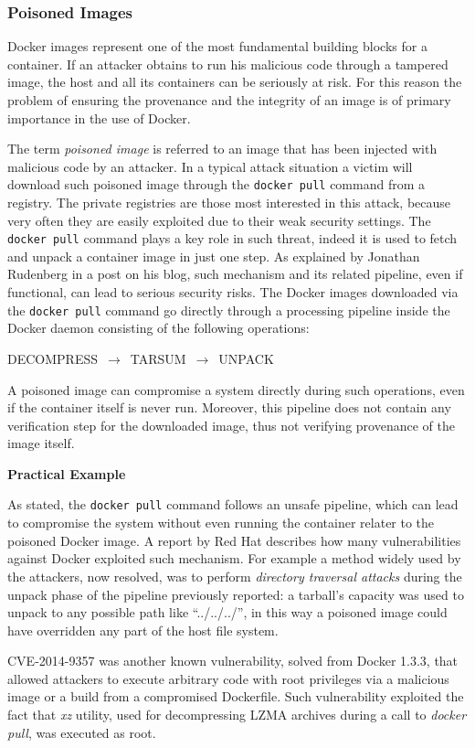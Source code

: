 \documentclass[a4paper,12pt]{article}
\newcommand{\code}[1]{\lstinline|#1|}
\begin{document}
\subsubsection{Poisoned Images}

Docker images represent one of the most fundamental building blocks for a
container. If an attacker obtains to run his malicious code through a tampered image, the host
and all its containers can be seriously at risk. For this reason the problem of
ensuring the provenance and the integrity of an image is of primary importance in the use of
Docker. \par The term \textit{poisoned image} is referred to an image that has
been injected with malicious code by an attacker. In a typical attack
situation a victim will download such poisoned image through the \code{docker
pull} command from a registry. The private registries are those most interested
in this attack, because very often they are easily exploited due to their weak
security settings. The \code{docker pull} command plays a key role in such
threat, indeed it is used to fetch and unpack a container image in just one
step. As explained by Jonathan Rudenberg in a post
\cite{docker_image_insecurity} on his blog, such mechanism and its related
pipeline, even if functional, can lead to serious security risks. The Docker
images downloaded via the \code{docker pull} command go directly through a
processing pipeline inside the Docker daemon consisting of the following
operations: \bigbreak\centerline{DECOMPRESS $\,\to\,$ TARSUM $\,\to\,$
UNPACK}\bigbreak A poisoned image can compromise a system directly during such
operations, even if the container itself is never run. Moreover, this pipeline
does not contain any verification step for the downloaded image, thus not
verifying provenance of the image itself. 

\bigbreak\textbf{Practical Example}\bigbreak 

As stated, the \code{docker pull} command follows an unsafe pipeline, which can
lead to compromise the system without even running the container relater to the
poisoned Docker image. A report by Red Hat \cite{docker_pull_red_hat} describes
how many vulnerabilities against Docker exploited such mechanism. For example a
method widely used by the attackers, now resolved, was to perform
\textit{directory traversal attacks} during the unpack phase of the pipeline
previously reported: a tarball's capacity was used to unpack to any possible
path like ``../../../'', in this way a poisoned image could have overridden any
part of the host file system. \par CVE-2014-9357 \cite{CVE-2014-9357} was
another known vulnerability, solved from Docker 1.3.3, that allowed attackers to
execute arbitrary code with root privileges via a malicious image or a build
from a compromised Dockerfile. Such vulnerability exploited the fact that
\textit{xz} utility, used for decompressing LZMA archives during a call to
\textit{docker pull}, was executed as root. 
\end{document}
